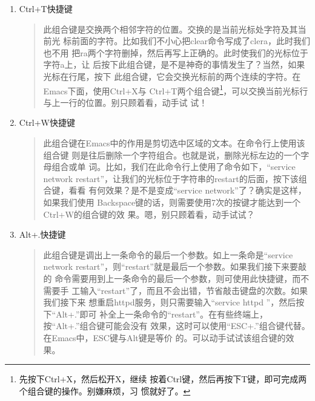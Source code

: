 \begin{enumerate}[itemsep=0pt,parsep=0pt]
\item Ctrl+T快捷键
  \begin{quote}
    此组合键是交换两个相邻字符的位置。交换的是当前光标处字符及其当前光
    标前面的字符。比如我们不小心把clear命令写成了clera，此时我们也不用
    把ra两个字符删掉，然后再写上正确的。此时使我们的光标位于字符a上，让
    后按下此组合键，是不是神奇的事情发生了？当然，如果光标在行尾，按下
    此组合键，它会交换光标前的两个连续的字符。在Emacs下面，使用Ctrl+X与
    Ctrl+T两个组合键\footnote{先按下Ctrl+X，然后松开X，继续
      按着Ctrl键，然后再按下T键，即可完成两个组合键的操作。别嫌麻烦，习
      惯就好了。}，可以交换当前光标行与上一行的位置。别只顾着看，动手试
    试！
  \end{quote}

\item Ctrl+W快捷键
  \begin{quote}
    此组合键在Emacs中的作用是剪切选中区域的文本。在命令行上使用该组合键
    则是往后删除一个字符组合。也就是说，删除光标左边的一个字母组合或单
    词。比如，我们在此命令行上使用了命令如下，“service network
    restart”，让我们的光标位于字符串的restart的后面，按下该组合键，看看
    有何效果？是不是变成“service network”了？确实是这样，如果我们使用
    Backspace键的话，则需要使用7次的按键才能达到一个Ctrl+W的组合键的效
    果。嗯，别只顾着看，动手试试？
  \end{quote}

\item Alt+.快捷键
  \begin{quote}
    此组合键是调出上一条命令的最后一个参数。如上一条命是“service
    network restart”，则“restart”就是最后一个参数。如果我们接下来要敲的
    命令需要用到上一条命令的最后一个参数，则可使用此快捷键，而不需要手
    工输入“restart”了，而且不会出错，节省敲击键盘的次数。如果我们接下来
    想重启httpd服务，则只需要输入“service httpd ”，然后按下“Alt+.”即可
    补全上一条命令的“restart”。在有些终端上，按“Alt+.”组合键可能会没有
    效果，这时可以使用“ESC+.”组合键代替。在Emacs中，ESC键与Alt键是等价
    的。可以动手试试该组合键的效果。
  \end{quote}

\end{enumerate}
